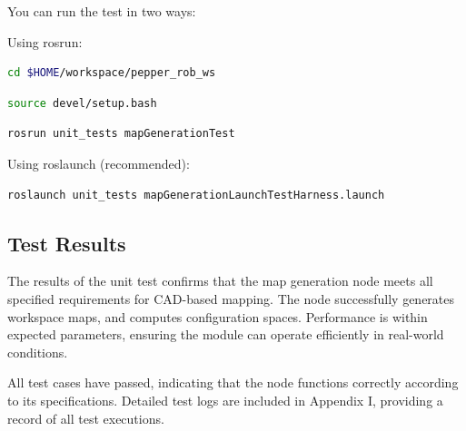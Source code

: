 \documentclass{CSSRforAfrica}
\begin{document}
\noindent You can run the test in two ways:

\noindent Using rosrun:
\begin{lstlisting}[style=withoutNumbering, language=bash]
cd $HOME/workspace/pepper_rob_ws
\end{lstlisting}
\begin{lstlisting}[style=withoutNumbering, language=bash]
source devel/setup.bash
\end{lstlisting}
\begin{lstlisting}[style=withoutNumbering, language=bash]
rosrun unit_tests mapGenerationTest
\end{lstlisting}
Using roslaunch (recommended):
\begin{lstlisting}[style=withoutNumbering, language=bash]
roslaunch unit_tests mapGenerationLaunchTestHarness.launch
\end{lstlisting}

\subsection{Test Results}

The results of the unit test confirms that the map generation node meets all specified requirements for CAD-based mapping. The node successfully generates workspace maps, and  computes configuration spaces. Performance is within expected parameters, ensuring the module can operate efficiently in real-world conditions.

\noindent All test cases have passed, indicating that the node functions correctly according to its specifications. Detailed test logs are included in Appendix I, providing a record of all test executions.

\newpage
\appendix
\end{document}
